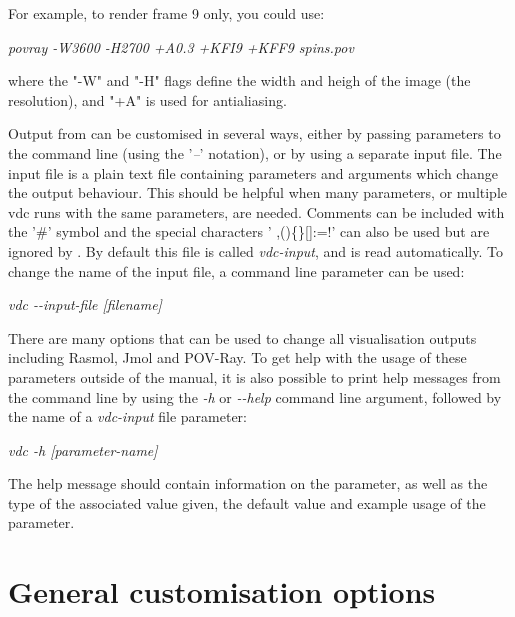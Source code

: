 For example, to render frame 9 only, you could use:

\noindent
\begin{minipage}[c]{\textwidth}
\centering
\textit{povray -W3600 -H2700 +A0.3 +KFI9 +KFF9 spins.pov}
\end{minipage}

\noindent where the "-W" and "-H" flags define the width and heigh of the image
(the resolution), and "+A" is used for antialiasing.

Output from \vdc can be customised in several ways, either by passing parameters
to the command line (using the '\textit{--}' notation), or by using a separate
\vdc input file. The \vdc input file is a plain text file containing parameters
and arguments which change the output behaviour. This should be helpful when
many parameters, or multiple vdc runs with the same parameters, are needed.
Comments can be included with the '\#' symbol and the special characters
' ,()\{\}[]:=!' can also be used but are ignored by \vdc.  By default this file
is called \textit{vdc-input}, and is read automatically. To change the name of
the \vdc input file, a command line parameter can be used:

\noindent
\begin{minipage}[c]{\textwidth}
\centering
\textit{vdc -{}-input-file [filename]}
\end{minipage}

There are many options that can be used to change all visualisation outputs
including Rasmol, Jmol and POV-Ray. To get help with the usage of these
parameters outside of the manual, it is also possible to print help messages
from the command line by using the \textit{-h} or \textit{-{}-help} command line
argument, followed by the name of a \textit{vdc-input} file parameter:

\noindent
\begin{minipage}[c]{\textwidth}
\centering
\textit{vdc -h [parameter-name]}
\end{minipage}

The help message should contain information on the parameter, as well as the
type of the associated value given, the default value and example usage of the
parameter.

\section*{General customisation options}

